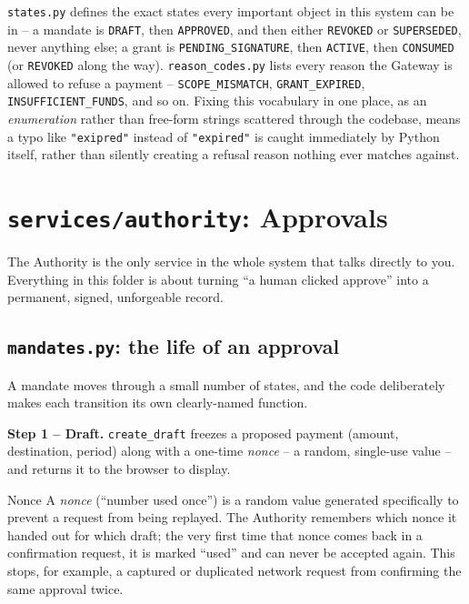 \documentclass[11pt]{report}
\newcommand{\file}[1]{\texttt{#1}}
\newcommand{\code}[1]{\texttt{#1}}
\begin{document}
\file{states.py} defines the exact states every important object in this
system can be in -- a mandate is \code{DRAFT}, then \code{APPROVED}, and
then either \code{REVOKED} or \code{SUPERSEDED}, never anything else; a
grant is \code{PENDING\_SIGNATURE}, then \code{ACTIVE}, then
\code{CONSUMED} (or \code{REVOKED} along the way). \file{reason\_codes.py}
lists every reason the Gateway is allowed to refuse a payment --
\code{SCOPE\_MISMATCH}, \code{GRANT\_EXPIRED}, \code{INSUFFICIENT\_FUNDS},
and so on. Fixing this vocabulary in one place, as an
\emph{enumeration} rather than free-form strings scattered through the
codebase, means a typo like \code{"exipred"} instead of \code{"expired"}
is caught immediately by Python itself, rather than silently creating a
refusal reason nothing ever matches against.

\chapter{\file{services/authority}: Approvals}
\label{ch:authority}

The Authority is the only service in the whole system that talks directly
to you. Everything in this folder is about turning ``a human clicked
approve'' into a permanent, signed, unforgeable record.

\section{\file{mandates.py}: the life of an approval}

A mandate moves through a small number of states, and the code
deliberately makes each transition its own clearly-named function.

\textbf{Step 1 -- Draft.} \code{create\_draft} freezes a proposed
payment (amount, destination, period) along with a one-time
\emph{nonce} -- a random, single-use value -- and returns it to the
browser to display.

\begin{concept}{Nonce}
A \emph{nonce} (``number used once'') is a random value generated
specifically to prevent a request from being replayed. The Authority
remembers which nonce it handed out for which draft; the very first time
that nonce comes back in a confirmation request, it is marked ``used'' and
can never be accepted again. This stops, for example, a captured or
duplicated network request from confirming the same approval twice.
\end{concept}
\end{document}

